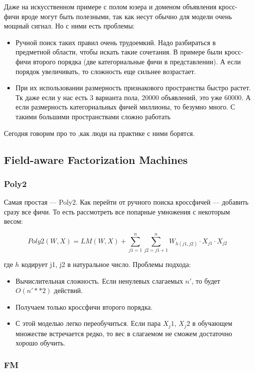 \documentclass[12pt]{article}
\begin{document}
Даже на искусственном примере с полом юзера и доменом объявления кросс-фичи вроде могут быть полезными, так как несут обычно для модели очень мощный сигнал. Но с ними есть проблемы:
\begin{itemize}
    \item  Ручной поиск таких правил очень трудоемкий. Надо разбираться в предметной области, чтобы искать такие сочетания. В примере были кросс-фичи второго порядка (две категориальные фичи в представлении). А если порядок увеличивать, то сложность еще сильнее возрастает.
    
    \item При их использовании размерность признакового пространства быстро растет. Тк даже если у нас есть 3 варианта пола, 20000 объявлений, это уже 60000. А если размерность категориальных фичей миллионы, то безумно много. С такими большими пространствами сложно работать
\end{itemize}

Сегодня говорим про то ,как люди на практике с ними борятся.

\subsection{Field-aware Factorization Machines} 

\subsubsection{Poly2} 

Самая простая --- Poly2. Как перейти от ручного поиска кроссфичей --- добавить сразу все фичи. То есть рассмотреть все попарные умножения с некоторым весом:

$$ Poly2(W, X) = LM(W, X) + \sum_{j1=1}^{n} {\sum_{j2=j1+1}^{n} W_{h(j1, j2)}\cdot X_{j1} \cdot X_{j2}} $$

где $h$ кодирует j1, j2 в натуральное число. Проблемы подхода:
\begin{itemize}
    \item Вычислительная сложность. Если ненулевых слагаемых $n'$, то будет $O(n'**2)$ действий.
    \item Получаем только кроссфичи второго порядка.
    \item С этой моделью легко переобучиться. Если пара $X_j1$, $X_j2$ в обучающем множестве встречается редко, то вес в слагаемом не сможем достаточно хорошо обучить. 
\end{itemize}

\subsubsection{FM} 
\end{document}
